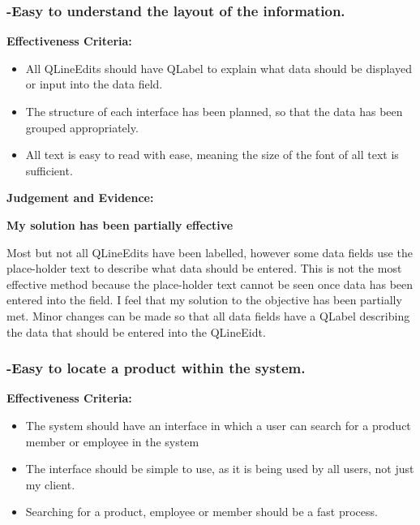 \pagebreak
\subsubsection{-Easy to understand the layout of the information.}

\textbf{Effectiveness Criteria:}\newline
\begin{itemize}
	\item{All QLineEdits should have QLabel to explain what data should be displayed or input into the data field.}
	\item{The structure of each interface has been planned, so that the data has been grouped appropriately.}
	\item{All text is easy to read with ease, meaning the size of the font of all text is sufficient.}
\end{itemize}

\textbf{Judgement and Evidence:} \newline

\textbf{\large{My solution has been partially effective}}


Most but not all QLineEdits have been labelled, however some data fields use the place-holder text to describe what data should be entered. This is not the most effective method because the place-holder text cannot be seen once data has been entered into the field. I feel that my solution to the objective has been partially met. Minor changes can be made so that all data fields have a QLabel describing the data that should be entered into the QLineEidt.









\pagebreak
\subsubsection{-Easy to locate a product within the system.}
\label{fig:search-evidence}

\textbf{Effectiveness Criteria:}\newline
\begin{itemize}
	\item{The system should have an interface in which a user can search for a product member or employee in the system}
	\item{The interface should be simple to use, as it is being used by all users, not just my client.}
	\item{Searching for a product, employee or member should be a fast process.}
\end{itemize}

